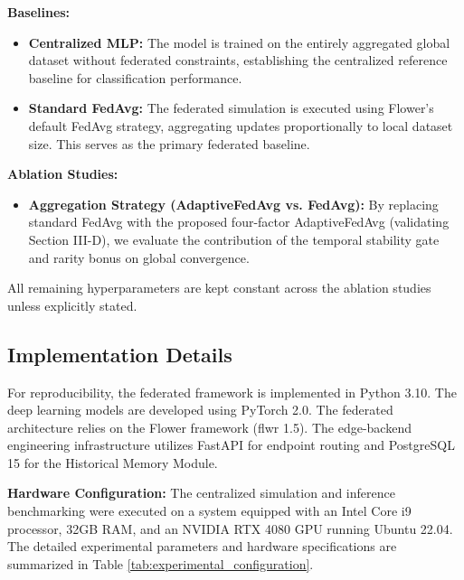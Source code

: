 \textbf{Baselines:}
\begin{itemize}
    \item \textbf{Centralized MLP:} The model is trained on the entirely aggregated global dataset without federated constraints, establishing the centralized reference baseline for classification performance.
    \item \textbf{Standard FedAvg:} The federated simulation is executed using Flower's default FedAvg strategy, aggregating updates proportionally to local dataset size. This serves as the primary federated baseline.
\end{itemize}

\textbf{Ablation Studies:}
\begin{itemize}
    \item \textbf{Aggregation Strategy (AdaptiveFedAvg vs. FedAvg):} By replacing standard FedAvg with the proposed four-factor AdaptiveFedAvg (validating Section III-D), we evaluate the contribution of the temporal stability gate and rarity bonus on global convergence.
\end{itemize}

All remaining hyperparameters are kept constant across the ablation studies unless explicitly stated.

\subsection{Implementation Details}

For reproducibility, the federated framework is implemented in Python 3.10. The deep learning models are developed using PyTorch 2.0. The federated architecture relies on the Flower framework (flwr 1.5). The edge-backend engineering infrastructure utilizes FastAPI for endpoint routing and PostgreSQL 15 for the Historical Memory Module.

\textbf{Hardware Configuration:}
The centralized simulation and inference benchmarking were executed on a system equipped with an Intel Core i9 processor, 32GB RAM, and an NVIDIA RTX 4080 GPU running Ubuntu 22.04. The detailed experimental parameters and hardware specifications are summarized in Table \ref{tab:experimental_configuration}.


